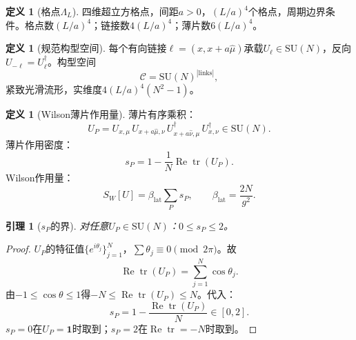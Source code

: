 \documentclass[12pt,a4paper]{article}
\theoremstyle{plain}
\newtheorem{lemma}[theorem]{引理}
\theoremstyle{definition}
\newtheorem{definition}[theorem]{定义}
\theoremstyle{remark}
\begin{document}
\begin{definition}[格点$\Lambda_L$]\label{def:lattice}
四维超立方格点，间距$a>0$，$(L/a)^4$个格点，周期边界条件。格点数$(L/a)^4$；链接数$4(L/a)^4$；薄片数$6(L/a)^4$。
\end{definition}

\begin{definition}[规范构型空间]\label{def:config}
每个有向链接$\ell=(x,x+a\hat\mu)$承载$U_\ell\in\mathrm{SU}(N)$，反向$U_{-\ell}=U_\ell^\dagger$。构型空间
\begin{equation}\label{eq:config}
\mathcal{C} = \mathrm{SU}(N)^{|\mathrm{links}|},
\end{equation}
紧致光滑流形，实维度$4(L/a)^4(N^2-1)$。
\end{definition}

\begin{definition}[Wilson薄片作用量]\label{def:wilson}
薄片有序乘积：
\begin{equation}\label{eq:UP}
U_P = U_{x,\mu}\,U_{x+a\hat\mu,\nu}\,U_{x+a\hat\nu,\mu}^\dagger\,U_{x,\nu}^\dagger \in \mathrm{SU}(N).
\end{equation}
薄片作用密度：
\begin{equation}\label{eq:sp}
s_P = 1 - \frac{1}{N}\operatorname{Re}\operatorname{tr}(U_P).
\end{equation}
Wilson作用量：
\begin{equation}\label{eq:SW}
S_W[U] = \beta_{\mathrm{lat}}\sum_P s_P, \qquad \beta_{\mathrm{lat}} = \frac{2N}{g^2}.
\end{equation}
\end{definition}

\begin{lemma}[$s_P$的界]\label{lem:sp}
对任意$U_P\in\mathrm{SU}(N)$：$0\leq s_P\leq 2$。
\end{lemma}

\begin{proof}
$U_P$的特征值$\{e^{i\theta_j}\}_{j=1}^N$，$\sum\theta_j\equiv 0\pmod{2\pi}$。故
\begin{equation}
\operatorname{Re}\operatorname{tr}(U_P) = \sum_{j=1}^N \cos\theta_j.
\end{equation}
由$-1\leq\cos\theta\leq 1$得$-N\leq\operatorname{Re}\operatorname{tr}(U_P)\leq N$。代入：
\begin{equation}
s_P = 1 - \frac{\operatorname{Re}\operatorname{tr}(U_P)}{N} \in [0,2].
\end{equation}
$s_P=0$在$U_P=\mathbf{1}$时取到；$s_P=2$在$\operatorname{Re}\operatorname{tr}=-N$时取到。
\end{proof}
\end{document}
